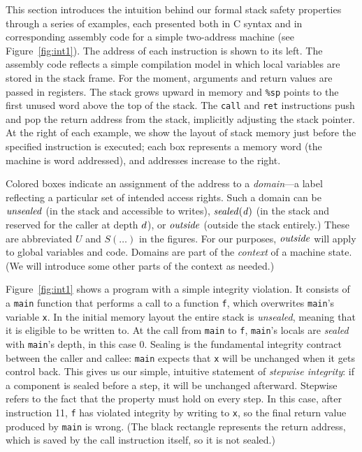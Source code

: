 \documentclass[acmsmall,review,anonymous]{acmart}\settopmatter{printfolios=true,printccs=false,printacmref=false}
\begin{document}
This section introduces the intuition behind our formal stack safety properties through a series
of examples, each presented both in C syntax and in corresponding assembly code for a
simple two-address machine (see Figure~\ref{fig:int1}). The address of each
instruction is shown to its left.
The assembly code reflects a simple compilation model in which
local variables are stored in the stack frame.
For the moment, arguments and return values are passed in registers.
The stack grows upward in
memory and {\tt \%sp} points to the first unused word above the top of the stack.
The {\tt call} and {\tt ret} instructions push and pop the return address from the stack,
implicitly adjusting the stack pointer.
At the right of each example, we show the layout of stack memory just before
the specified instruction is executed; each box represents a memory word
(the machine is word addressed), and addresses increase to the right.

%
Colored boxes indicate an assignment of the address to a
{\em domain}---a label reflecting a particular set of intended access
rights. Such a domain 
can be \(\mathit{unsealed}\) (in the stack and accessible to writes), \(\mathit{sealed(d)}\)
(in the stack and reserved for the caller at depth \(d\)), or \(\mathit{outside}\)
(outside the stack entirely.) These are abbreviated \(U\) and \(S(\dots)\) in the
figures. For our purposes, \(\mathit{outside}\) will apply to global
variables and code. Domains are part of the {\em context} of a machine state.
(We will introduce some other parts of the context as needed.)

Figure~\ref{fig:int1} shows a program with a simple integrity violation. It consists of a {\tt main}
function that performs a call to a function {\tt f}, which overwrites {\tt main}'s
variable {\tt x}. In the initial memory layout the entire stack is {\em unsealed},
meaning that it is eligible to be written to. At the call from {\tt main} to
{\tt f}, {\tt main}'s locals are {\em sealed} with {\tt main}'s depth,
in this case 0. Sealing is the fundamental integrity contract between the caller and callee:
{\tt main} expects that {\tt x} will be unchanged when it gets control back.
This gives us our simple, intuitive statement of {\em stepwise integrity}:
if a component is sealed before a step, it will be unchanged afterward. Stepwise
refers to the fact that the property must hold on every step. %
In this case, after instruction 11, {\tt f} has violated integrity by writing to {\tt x},
so the final return value produced by {\tt main} is wrong.
%
(The black rectangle represents the return address, which is saved by the call
instruction itself, so it is not sealed.)
\end{document}
